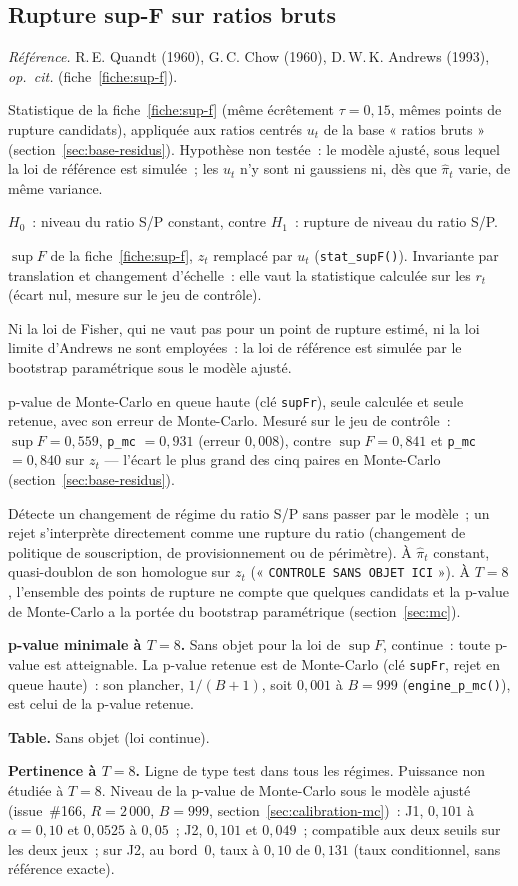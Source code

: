\documentclass[a4paper,11pt]{article}
\newcommand{\code}[1]{\texttt{\small #1}}
\newcommand{\refl}[1]{{\small\textcolor{maincolor!70!black}{\textit{Référence.} #1}}\par\smallskip}
\newcounter{ficheid}
\newenvironment{fiche}[1]{%
  \stepcounter{ficheid}%
  \phantomsection
  \subsection{#1}%
  \label{fiche:\theficheid}%
}{%
  \end{description}\vspace{0.5em}%
}
\newcommand{\Cadre}{%
  \begin{description}[leftmargin=0pt, style=unboxed, itemsep=3pt, topsep=3pt, parsep=2pt]%
  \item[\textcolor{financeblue}{\textbf{1. Cadre, notations et hypothèses de validité (non testées).}}]}
\newcommand{\Hzero}{\item[\textcolor{financeblue}{\textbf{2. Hypothèse nulle.}}]}
\newcommand{\Stat}{\item[\textcolor{financeblue}{\textbf{3. Statistique de test.}}]}
\newcommand{\Loi}{\item[\textcolor{financeblue}{\textbf{4. Loi sous $H_0$.}}]}
\newcommand{\Pval}{\item[\textcolor{financeblue}{\textbf{5. p-value.}}]}
\newcommand{\Usage}{\item[\textcolor{financeblue}{\textbf{6. Usage et limites.}}]}
\newcommand{\Pertinence}{\item[\textcolor{financeblue}{\textbf{7. Pertinence et puissance à faible $T$.}}]}
\begin{document}
\begin{fiche}{Rupture sup-F sur ratios bruts}
\label{fiche:sup-f-ratios-bruts}%
\refl{R.\,E. Quandt (1960), G.\,C. Chow (1960), D.\,W.\,K. Andrews (1993), \emph{op.\ cit.}
(fiche~\ref{fiche:sup-f}).}
\Cadre
Statistique de la fiche~\ref{fiche:sup-f} (même écrêtement $\tau = 0{,}15$, mêmes points de
rupture candidats), appliquée aux ratios centrés $u_t$ de la base « ratios bruts »
(section~\ref{sec:base-residus}). Hypothèse non testée~: le modèle ajusté, sous lequel la loi de
référence est simulée~; les $u_t$ n'y sont ni gaussiens ni, dès que $\hat\pi_t$ varie, de même
variance.
\Hzero
$H_0$~: niveau du ratio S/P constant, contre $H_1$~: rupture de niveau du ratio S/P.
\Stat
$\sup F$ de la fiche~\ref{fiche:sup-f}, $z_t$ remplacé par $u_t$ (\code{stat\_supF()}).
Invariante par translation et changement d'échelle~: elle vaut la statistique calculée sur les
$r_t$ (écart nul, mesure sur le jeu de contrôle).
\Loi
Ni la loi de Fisher, qui ne vaut pas pour un point de rupture estimé, ni la loi limite
d'Andrews ne sont employées~: la loi de référence est simulée par le bootstrap paramétrique sous
le modèle ajusté.
\Pval
p-value de Monte-Carlo en queue haute (clé \code{supFr}), seule calculée et seule retenue, avec
son erreur de Monte-Carlo. Mesuré sur le jeu de contrôle~: $\sup F = 0{,}559$, \code{p\_mc}
$= 0{,}931$ (erreur $0{,}008$), contre $\sup F = 0{,}841$ et \code{p\_mc} $= 0{,}840$ sur
$z_t$ --- l'écart le plus grand des cinq paires en Monte-Carlo (section~\ref{sec:base-residus}).
\Usage
Détecte un changement de régime du ratio S/P sans passer par le modèle~; un rejet s'interprète
directement comme une rupture du ratio (changement de politique de souscription, de
provisionnement ou de périmètre). À $\hat\pi_t$ constant, quasi-doublon de son homologue sur
$z_t$ (« \code{CONTROLE SANS OBJET ICI} »). À $T = 8$, l'ensemble des points de rupture ne compte
que quelques candidats et la p-value de Monte-Carlo a la portée du bootstrap paramétrique
(section~\ref{sec:mc}).
\Pertinence
\textbf{p-value minimale à $T = 8$.} Sans objet pour la loi de $\sup F$, continue~: toute p-value est atteignable. La p-value retenue est de Monte-Carlo (clé \code{supFr}, rejet en queue haute)~: son plancher, $1/(B+1)$, soit $0{,}001$ à $B = 999$ (\code{engine\_p\_mc()}), est celui de la p-value retenue.

\textbf{Table.} Sans objet (loi continue).

\textbf{Pertinence à $T = 8$.} Ligne de type test dans tous les régimes. Puissance non étudiée à $T = 8$. Niveau de la p-value de Monte-Carlo sous le modèle ajusté (issue~\#166, $R = 2\,000$, $B = 999$, section~\ref{sec:calibration-mc})~: J1, $0{,}101$ à $\alpha = 0{,}10$ et $0{,}0525$ à $0{,}05$~; J2, $0{,}101$ et $0{,}049$~; compatible aux deux seuils sur les deux jeux~; sur J2, au bord~0, taux à $0{,}10$ de $0{,}131$ (taux conditionnel, sans référence exacte).


\end{fiche}
\end{document}
